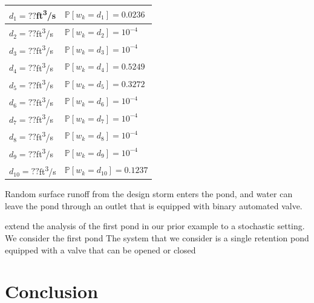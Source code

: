 \documentclass[letterpaper, 10 pt, conference]{ieeeconf}  %
\begin{document}
\begin{table}
\begin{center}
\caption{}
\begin{tabular}{| p{2cm} | p{3cm} |}
\hline
$d_1 = ??$ft\textsuperscript{3}/s & $\mathbb{P}[w_k = d_1] = 0.0236$ \\ \hline
$d_2 = ??$ft\textsuperscript{3}/s & $\mathbb{P}[w_k = d_2] = 10^{-4}$ \\ \hline
$d_3 = ??$ft\textsuperscript{3}/s & $\mathbb{P}[w_k = d_3] = 10^{-4}$ \\ \hline
$d_4 = ??$ft\textsuperscript{3}/s & $\mathbb{P}[w_k = d_4] = 0.5249$ \\ \hline
$d_5 = ??$ft\textsuperscript{3}/s & $\mathbb{P}[w_k = d_5] = 0.3272$ \\ \hline
$d_6 = ??$ft\textsuperscript{3}/s & $\mathbb{P}[w_k = d_6] = 10^{-4}$ \\ \hline
$d_7 = ??$ft\textsuperscript{3}/s & $\mathbb{P}[w_k = d_7] = 10^{-4}$ \\ \hline
$d_8 = ??$ft\textsuperscript{3}/s & $\mathbb{P}[w_k = d_8] = 10^{-4}$ \\ \hline
$d_9 = ??$ft\textsuperscript{3}/s & $\mathbb{P}[w_k = d_9] = 10^{-4}$ \\ \hline
$d_{10} = ??$ft\textsuperscript{3}/s & $\mathbb{P}[w_k = d_{10}] = 0.1237$ \\ \hline
\end{tabular}
\begin{flushleft} \end{flushleft}
\label{dist}
\end{center}
\end{table}

Random surface runoff from the design storm enters the pond,
and water can leave the pond through an outlet that is equipped with binary automated valve.




extend the analysis of the first pond in our prior example to a stochastic setting. We consider the first pond The system that we consider is a single retention pond equipped with a valve
that can be opened or closed





\section{Conclusion}\label{conc}
\end{document}
